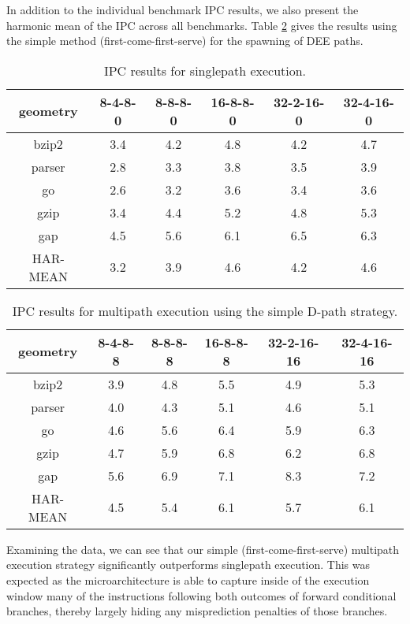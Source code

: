 \documentclass[10pt,dvips]{article}
\begin{document}
In addition to the individual benchmark IPC results, we also
present the harmonic mean of the IPC across all benchmarks.
Table \ref{tab:ipc2} gives the results using the simple method 
(first-come-first-serve) for
the spawning of DEE paths.
%
\begin{table}
\begin{center}
\caption{IPC results for singlepath execution.}
\label{tab:ipc1}
\begin{tabular}{|c|c|c|c|c|c|}
\hline 
geometry&
8-4-8-0&
8-8-8-0&
16-8-8-0&
32-2-16-0&
32-4-16-0\\
\hline 
\hline
bzip2&3.4&4.2&4.8&4.2&4.7\\
\hline 
parser&2.8&3.3&3.8&3.5&3.9\\
\hline 
go&2.6&3.2&3.6&3.4&3.6\\
\hline 
gzip&3.4&4.4&5.2&4.8&5.3\\
\hline 
gap&4.5&5.6&6.1&6.5&6.3\\
\hline
\hline 
HAR-MEAN&3.2&3.9&4.6&4.2&4.6\\
\hline
\end{tabular}
\end{center}
\end{table}
%
\begin{table}
\begin{center}
\caption{IPC results for multipath execution using the 
simple D-path strategy.}
\label{tab:ipc2}
\begin{tabular}{|c|c|c|c|c|c|}
\hline 
geometry&
8-4-8-8&
8-8-8-8&
16-8-8-8&
32-2-16-16&
32-4-16-16\\
\hline 
\hline 
bzip2&3.9&4.8&5.5&4.9&5.3\\
\hline 
parser&4.0&4.3&5.1&4.6&5.1\\
\hline 
go&4.6&5.6&6.4&5.9&6.3\\
\hline 
gzip&4.7&5.9&6.8&6.2&6.8\\
\hline 
gap&5.6&6.9&7.1&8.3&7.2\\
\hline 
\hline 
HAR-MEAN&4.5&5.4&6.1&5.7&6.1\\
\hline
\end{tabular}
\end{center}
\end{table}
%

Examining the data, we can see that our simple 
(first-come-first-serve)
multipath execution
strategy significantly outperforms singlepath execution.
This was expected as the microarchitecture is able to
capture inside of the execution window 
many of the instructions following both outcomes
of forward conditional branches,
thereby largely hiding any misprediction penalties of those branches.
\end{document}
